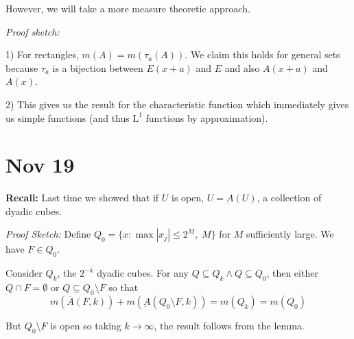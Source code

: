 \documentclass[12pt]{report}
\newcommand{\R}{\mathbb{R}}
\newcommand{\C}{\mathbb{C}}
\newcommand{\abs}[1]{\left\vert #1 \right\vert}
\renewcommand{\L}{\text{L}}
\newcommand{\sub}{\subseteq}
\renewcommand{\bar}[1]{\overline{#1}}
\newcommand*{\tbf}[1]{\ifmmode\mathbf{#1}\else\textbf{#1}\fi}
\newenvironment*{tbox}[2][gray]{
    \begin{tcolorbox}[
        parbox=false,
        colback=#1!5!white,
        colframe=#1!75!black,
        breakable,
        title={#2}
    ]}
    {\end{tcolorbox}}
\begin{document}
    However, we will take a more measure theoretic approach. 

    \begin{tbox}{\textbf{Theorem (Translation Invariance):} Let $\tau_a(x) = x + a$ for $a \in \R^n$. Then,
        \begin{enumerate}
            \item $m(\tau_a(E)) = m(E)$
            \item If $f: \R^n \to \C$ is either $\geq 0$ or in $\L^1$, 
            \[\int f(x + a)\; d\mu= \int f\; d\mu \]
        \end{enumerate}}
        \emph{Proof sketch:} 
        
        1) For rectangles, $m(A) = m(\tau_a(A))$. We claim this holds for general sets because $\tau_a$ is a bijection between $E(x + a)$ and $E$ and also $A(x + a)$ and $A(x)$.
        
        2) This gives us the result for the characteristic function which immediately gives us simple functions (and thus $\L^1$ functions by approximation).

    \end{tbox}

\section*{Nov 19}
    \tbf{Recall:} Last time we showed that if $U$ is open, $U = \underbar A(U)$, a collection of dyadic cubes.

    \begin{tbox}{\textbf{Corollary:} Let $U$ be open, then the \tbf{inner content} is $m(U) = m(\underbar A(U))$. Let $F \sub \R^n$ be a compact set. Then the \tbf{outer content} is $m(F) = m(\bar A(F))$.} 
        \emph{Proof Sketch:} Define $Q_0 = \{x: \max\abs{x_j} \leq 2^M, \; M\}$ for $M$ sufficiently large. We have $F \in Q_0$. 

        Consider $Q_k$, the $2^{-k}$ dyadic cubes. For any $Q \sub Q_k \land Q \sub Q_0$, then either $Q \cap F = \emptyset$ or $Q \sub Q_0\setminus F$ so that 
        \[m(\bar A(F, k)) + m(\underbar A(Q_0 \setminus F, k)) = m(Q_k) = m(Q_0)\]

        But $Q_0 \setminus F$ is open so taking $k \to \infty$, the result follows from the lemma.
    \end{tbox}
\end{document}
